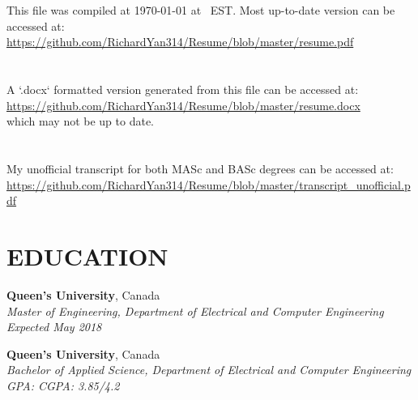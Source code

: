 \documentclass[margin]{res}
\newcommand{\fullhrulefill}{%
  \hspace*{-\sectionwidth}\hrulefill%
  }
\begin{document}
\begin{resume}


\fullhrulefill

\section{}
This file was compiled at 
{\shortdate\today} at \currenttime~EST.
Most up-to-date version can be accessed at: \\
\url{https://github.com/RichardYan314/Resume/blob/master/resume.pdf}

\section{}
A `.docx` formatted version generated from this file can be accessed at: \\
\url{https://github.com/RichardYan314/Resume/blob/master/resume.docx} \\
which may not be up to date.

\section{}
My unofficial transcript for both MASc and BASc degrees can be accessed at:\\
\url{https://github.com/RichardYan314/Resume/blob/master/transcript_unofficial.pdf}


\section{EDUCATION}
\textbf{Queen's University}, Canada\\
{\sl Master of Engineering, Department of Electrical and Computer Engineering\\
Expected May 2018}

\textbf{Queen's University}, Canada\\
{\sl Bachelor of Applied Science, Department of Electrical and Computer Engineering\\
GPA: 
\hfill CGPA: 3.85/4.2}




\end{resume}
\end{document}
